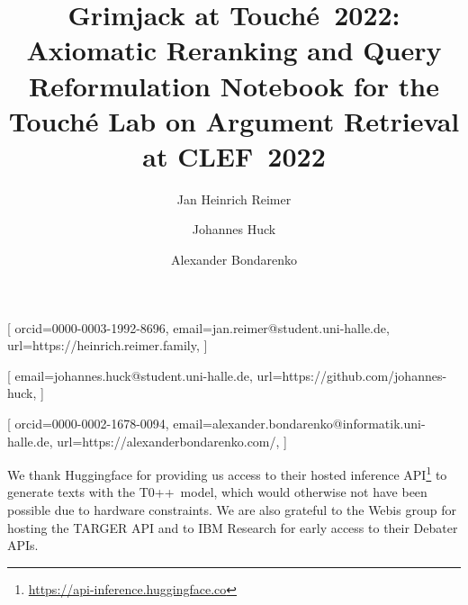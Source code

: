 \documentclass{ceurart}
\begin{document}

\title{%
  Grimjack at \texorpdfstring{Touché~2022}{Touché 2022}:\texorpdfstring{\\}{ }
  Axiomatic Reranking and Query Reformulation%
}
\title[mode=sub]{%
  Notebook for the Touché Lab on Argument Retrieval at CLEF\ 2022%
}

\author{Jan Heinrich Reimer}[
  orcid=0000-0003-1992-8696,
  email=jan.reimer@student.uni-halle.de,
  url=https://heinrich.reimer.family,
]
\author{Johannes Huck}[
  email=johannes.huck@student.uni-halle.de,
  url=https://github.com/johannes-huck,
]
\author{Alexander Bondarenko}[
  orcid=0000-0002-1678-0094,
  email=alexander.bondarenko@informatik.uni-halle.de,
  url=https://alexanderbondarenko.com/,
]

\address{%
  Martin-Luther-Universität Halle-Wittenberg,
  06099~Halle~(Saale), Germany
}



\maketitle







\begin{acknowledgments}
  We thank Huggingface for providing us access to their hosted inference API\footnote{\url{https://api-inference.huggingface.co}} to generate texts with the T0++~model, which would otherwise not have been possible due to hardware constraints. 
  We are also grateful to the Webis group for hosting the TARGER API and to IBM Research for early access to their Debater APIs.
\end{acknowledgments}


\end{document}
